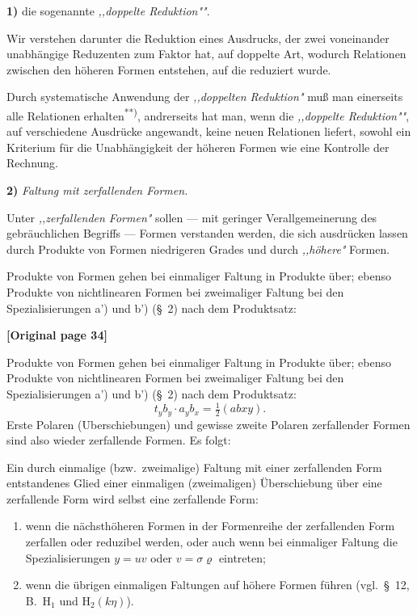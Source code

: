\documentclass[12pt,a4paper]{article}
\begin{document}
\textbf{1)} die sogenannte \textit{,,doppelte Reduktion"{}"}.

Wir verstehen darunter die Reduktion eines Ausdrucks, der zwei voneinander unabhängige Reduzenten zum Faktor hat, auf doppelte Art, wodurch Relationen zwischen den höheren Formen entstehen, auf die reduziert wurde.

Durch systematische Anwendung der \textit{,,doppelten Reduktion"{}} muß man einerseits alle Relationen erhalten\textsuperscript{**)}, andrerseits hat man, wenn die \textit{,,doppelte Reduktion"{}"}, auf verschiedene Ausdrücke angewandt, keine neuen Relationen liefert, sowohl ein Kriterium für die Unabhängigkeit der höheren Formen wie eine Kontrolle der Rechnung.

\textbf{2)} \textit{Faltung mit zerfallenden Formen.}

Unter \textit{,,zerfallenden Formen"{}} sollen --- mit geringer Verallgemeinerung des gebräuchlichen Begriffs --- Formen verstanden werden, die sich ausdrücken lassen durch Produkte von Formen niedrigeren Grades und durch \textit{,,höhere"{}} Formen.

Produkte von Formen gehen bei einmaliger Faltung in Produkte über; ebenso Produkte von nichtlinearen Formen bei zweimaliger Faltung bei den Spezialisierungen a') und b') (\S\ 2) nach dem Produktsatz:


\noindent\textbf{[Original page 34]}

Produkte von Formen gehen bei einmaliger Faltung in Produkte über; ebenso Produkte von nichtlinearen Formen bei zweimaliger Faltung bei den Spezialisierungen a') und b') (\S\ 2) nach dem Produktsatz:
\[t_y b_y \cdot a_y b_x = \tfrac{1}{2} (abxy).\]
Erste Polaren (Uberschiebungen) und gewisse zweite Polaren zerfallender Formen sind also wieder zerfallende Formen. Es folgt:

Ein durch einmalige (bzw.\ zweimalige) Faltung mit einer zerfallenden Form entstandenes Glied einer einmaligen (zweimaligen) Überschiebung über eine zerfallende Form wird selbst eine zerfallende Form:
\begin{enumerate}
\item[a)] wenn die nächsthöheren Formen in der Formenreihe der zerfallenden Form zerfallen oder reduzibel werden, oder auch wenn bei einmaliger Faltung die Spezialisierungen $y=uv$ oder $v=\sigma\varrho$ eintreten;
\item[b)] wenn die übrigen einmaligen Faltungen auf höhere Formen führen (vgl.\ \S\ 12, B.\ H$_1$ und H$_2(k\eta)$).
\end{enumerate}
\end{document}
